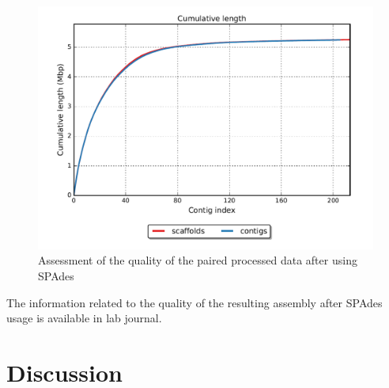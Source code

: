 \documentclass{article}
\begin{document}
\begin{figure}[h]
	\centering
\includegraphics[scale=0.5 ]{images/consca.png} 
\centering \caption{Assessment of the quality of the paired processed data after using SPAdes}
\label{scacof}
\end{figure}
The information related to the quality of the resulting assembly after SPAdes usage is available in lab journal. 




\section{Discussion}
\end{document}
